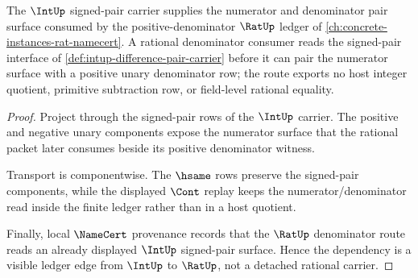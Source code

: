 \begin{theorem}
\label{thm:int-rat-denominator-ledger-dependency}
The $\IntUp$ signed-pair carrier supplies the numerator and denominator pair surface consumed by the positive-denominator $\RatUp$ ledger of \autoref{ch:concrete-instances-rat-namecert}. A rational denominator consumer reads the signed-pair interface of \autoref{def:intup-difference-pair-carrier} before it can pair the numerator surface with a positive unary denominator row; the route exports no host integer quotient, primitive subtraction row, or field-level rational equality.
\end{theorem}
\begin{proof}
Project through the signed-pair rows of the $\IntUp$ carrier. The positive and negative unary components expose the numerator surface that the rational packet later consumes beside its positive denominator witness.

Transport is componentwise. The $\hsame$ rows preserve the signed-pair components, while the displayed $\Cont$ replay keeps the numerator/denominator read inside the finite ledger rather than in a host quotient.

Finally, local $\NameCert$ provenance records that the $\RatUp$ denominator route reads an already displayed $\IntUp$ signed-pair surface. Hence the dependency is a visible ledger edge from $\IntUp$ to $\RatUp$, not a detached rational carrier.
\end{proof}
